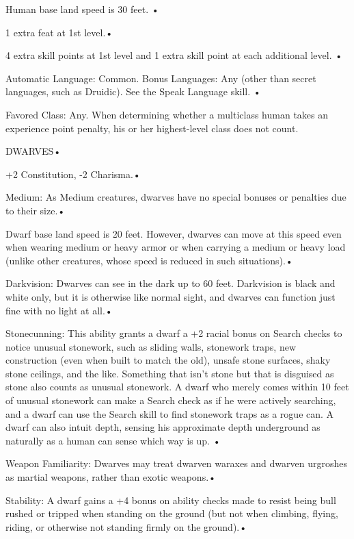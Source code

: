 \documentclass{article}
\begin{document}
Human base land speed is 30 feet. • 

\parindent=7pt
1 extra feat at 1st level.• 

\parindent=3pt
4 extra skill points at 1st level and 1 extra skill point at each additional level. 
• 

\parindent=7pt
Automatic Language: Common. Bonus Languages: Any (other than secret languages, 
such as Druidic). See the Speak Language skill. • 

\parindent=3pt
Favored Class: Any. When determining whether a multiclass human takes an experience 
point penalty, his or her highest-level class does not count.

\vspace{12pt}
\parindent=0pt
{\LARGE{}DWARVES• }

\parindent=3pt
+2 Constitution, -2 Charisma.• 

Medium: As Medium creatures, dwarves have no special bonuses or penalties due to 
their size.• 

\parindent=7pt
Dwarf base land speed is 20 feet. However, dwarves can move at this speed even 
when wearing medium or heavy armor or when carrying a medium or heavy load (unlike 
other creatures, whose speed is reduced in such situations).• 

\parindent=3pt
Darkvision: Dwarves can see in the dark up to 60 feet. Darkvision is black and 
white only, but it is otherwise like normal sight, and dwarves can function just 
fine with no light at all.• 

Stonecunning: This ability grants a dwarf a +2 racial bonus on Search checks to 
notice unusual stonework, such as sliding walls, stonework traps, new construction 
(even when built to match the old), unsafe stone surfaces, shaky stone ceilings, 
and the like. Something that isn't stone but that is disguised as stone also counts 
as unusual stonework. A dwarf who merely comes within 10 feet of unusual stonework 
can make a Search check as if he were actively searching, and a dwarf can use the 
Search skill to find stonework traps as a rogue can. A dwarf can also intuit depth, 
sensing his approximate depth underground as naturally as a human can sense which 
way is up. • 

\parindent=7pt
Weapon Familiarity: Dwarves may treat dwarven waraxes and dwarven urgroshes as 
martial weapons, rather than exotic weapons.• 

\parindent=3pt
Stability: A dwarf gains a +4 bonus on ability checks made to resist being bull 
rushed or tripped when standing on the ground (but not when climbing, flying, riding, 
or otherwise not standing firmly on the ground).• 
\end{document}
